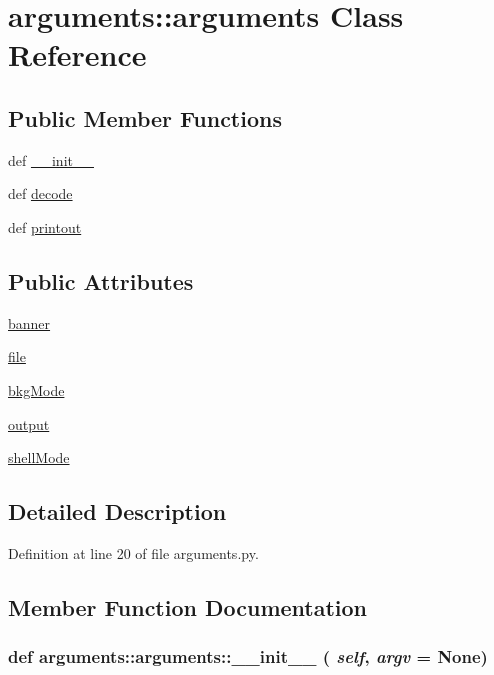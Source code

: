 \hypertarget{classarguments_1_1arguments}{
\section{arguments::arguments Class Reference}
\label{classarguments_1_1arguments}
}
\subsection*{Public Member Functions}
\begin{DoxyCompactItemize}
\item 
def \hyperlink{classarguments_1_1arguments_aa5b33d39a633f7e234fe59080a02bd5e}{\_\-\_\-init\_\-\_\-}
\item 
def \hyperlink{classarguments_1_1arguments_af121e06284eb522e769b34c01df5d1b4}{decode}
\item 
def \hyperlink{classarguments_1_1arguments_a7f17a7f2e7b18b5dbb4832ca4da325c2}{printout}
\end{DoxyCompactItemize}
\subsection*{Public Attributes}
\begin{DoxyCompactItemize}
\item 
\hyperlink{classarguments_1_1arguments_ad5009df36196a2d5310e8cbddea033a9}{banner}
\item 
\hyperlink{classarguments_1_1arguments_a48cb19b9b5f2884f9d7c555e013fb077}{file}
\item 
\hyperlink{classarguments_1_1arguments_af2ec3aa45a7187dd9bcf33fd0553fca5}{bkgMode}
\item 
\hyperlink{classarguments_1_1arguments_ae9ab26daffb9f630b9c676750cc50012}{output}
\item 
\hyperlink{classarguments_1_1arguments_a57f87d0344ab2072684fd6d545d06a6a}{shellMode}
\end{DoxyCompactItemize}


\subsection{Detailed Description}


Definition at line 20 of file arguments.py.

\subsection{Member Function Documentation}
\hypertarget{classarguments_1_1arguments_aa5b33d39a633f7e234fe59080a02bd5e}{
\subsubsection[{\_\-\_\-init\_\-\_\-}]{\setlength{\rightskip}{0pt plus 5cm}def arguments::arguments::\_\-\_\-init\_\-\_\- ( {\em self}, \/   {\em argv} = {\ttfamily None})}}
\label{classarguments_1_1arguments_aa5b33d39a633f7e234fe59080a02bd5e}


